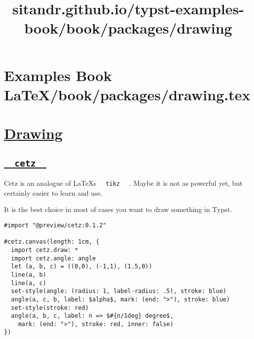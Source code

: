 \pandocbounded{}

\pandocbounded{}

\pandocbounded{}

\pandocbounded{}


\section{Examples Book LaTeX/book/packages/drawing.tex}
\title{sitandr.github.io/typst-examples-book/book/packages/drawing}

\section{\texorpdfstring{\hyperref[drawing]{Drawing}}{Drawing}}\label{drawing}

\subsection{\texorpdfstring{\hyperref[cetz]{\texttt{\ }{\texttt{\ cetz\ }}\texttt{\ }}}{  cetz  }}\label{cetz}

Cetz is an analogue of LaTeX\textquotesingle s
\texttt{\ }{\texttt{\ tikz\ }}\texttt{\ } . Maybe it is not as powerful
yet, but certainly easier to learn and use.

It is the best choice in most of cases you want to draw something in
Typst.

\begin{verbatim}
#import "@preview/cetz:0.1.2"

#cetz.canvas(length: 1cm, {
  import cetz.draw: *
  import cetz.angle: angle
  let (a, b, c) = ((0,0), (-1,1), (1.5,0))
  line(a, b)
  line(a, c)
  set-style(angle: (radius: 1, label-radius: .5), stroke: blue)
  angle(a, c, b, label: $alpha$, mark: (end: ">"), stroke: blue)
  set-style(stroke: red)
  angle(a, b, c, label: n => $#{n/1deg} degree$,
    mark: (end: ">"), stroke: red, inner: false)
})
\end{verbatim}

\pandocbounded{}

